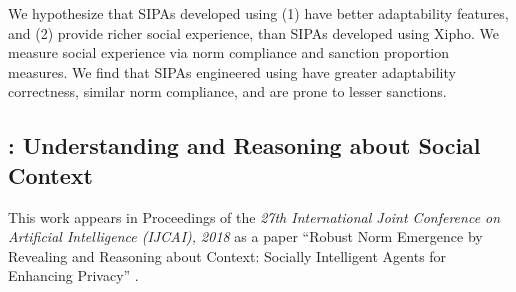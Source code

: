 We hypothesize that SIPAs developed using \frameworkA (1) have better
adaptability features, and (2) provide richer social experience, than
SIPAs developed using Xipho. We measure social experience via norm
compliance and sanction proportion measures. We find that SIPAs
engineered using \frameworkA have greater adaptability correctness,
similar norm compliance, and are prone to lesser sanctions.

\subsection[Understanding Social Context]{\frameworkB: Understanding and Reasoning about Social Context}

This work appears in Proceedings of the \emph{27th International Joint Conference on Artificial Intelligence (IJCAI), 2018}
as a paper ``Robust Norm Emergence by Revealing and Reasoning about Context: Socially Intelligent Agents for Enhancing Privacy'' \citep{IJCAI-18:Poros}.




